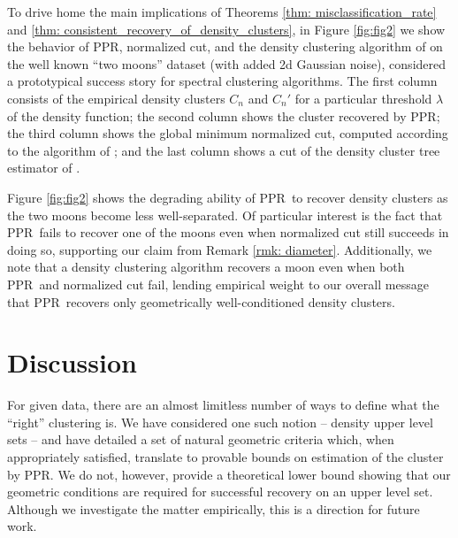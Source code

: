 \documentclass{article}
\newcommand{\1}{\mathbf{1}}
\newcommand{\ppr}{{\sc PPR}}
\newcommand{\pprspace}{{\sc PPR~}}
\theoremstyle{aldenthm}
\theoremstyle{aldenrmrk}
\begin{document}
To drive home the main implications of Theorems \ref{thm: misclassification_rate} and \ref{thm: consistent_recovery_of_density_clusters}, in Figure \ref{fig:fig2} we show the behavior of \ppr, normalized cut, and the density clustering algorithm of \citep{chaudhuri2010} on the well known ``two moons'' dataset (with added 2d Gaussian noise), considered a prototypical success story for spectral clustering algorithms. The first column consists of the empirical density clusters $C_n$ and $C_n'$ for a particular threshold $\lambda$ of the density function; the second column shows the cluster recovered by \ppr; the third column shows the global minimum normalized cut, computed according to the algorithm of \cite{szlam2010}; and the last column shows a cut of the density cluster tree estimator of \citep{chaudhuri2010}.

Figure \ref{fig:fig2} shows the degrading ability of \pprspace to recover density clusters as the two moons become less well-separated. Of particular interest is the fact that \pprspace fails to recover one of the moons even when normalized cut still succeeds in doing so, supporting our claim from Remark \ref{rmk: diameter}. Additionally, we note that a density clustering algorithm recovers a moon even when both \pprspace and normalized cut fail, lending empirical weight to our overall message that \pprspace recovers only geometrically well-conditioned density clusters.

\section{Discussion}
\label{sec: discussion}
For given data, there are an almost limitless number of ways to define what the ``right'' clustering is. We have considered one such notion -- density upper level sets -- and have detailed a set of natural geometric criteria which, when appropriately satisfied, translate to provable bounds on estimation of the cluster by \ppr. We do not, however, provide a theoretical lower bound showing that our geometric conditions are required for successful recovery on an upper level set. Although we investigate the matter empirically, this is a direction for future work.

\clearpage



\end{document}
